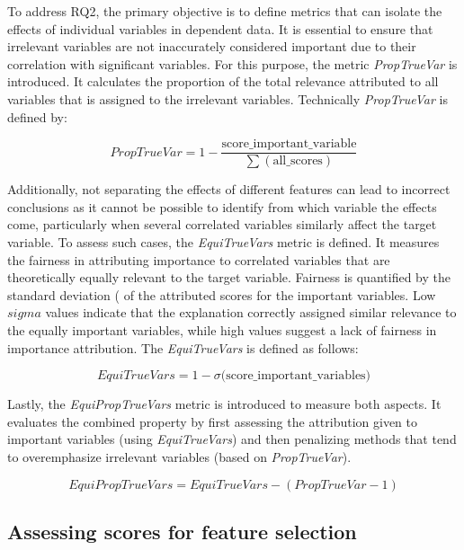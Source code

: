 To address RQ2, the primary objective is to define metrics that can isolate the effects of individual variables in dependent data. It is essential to ensure that irrelevant variables are not inaccurately considered important due to their correlation with significant variables. For this purpose, the metric \textit{PropTrueVar} is introduced. It calculates the proportion of the total relevance attributed to all variables that is assigned to the irrelevant variables. Technically \textit{PropTrueVar} is defined by:


\begin{equation}
\label{eq:lm+inter}
PropTrueVar = 1 - \frac{\text{score\_important\_variable}}{\sum(\text{all\_scores})}
\end{equation}


Additionally, not separating the effects of different features can lead to incorrect conclusions as it cannot be possible to identify from which variable the effects come, particularly when several correlated variables similarly affect the target variable. To assess such cases, the \textit{EquiTrueVars} metric is defined. It measures the fairness in attributing importance to correlated variables that are theoretically equally relevant to the target variable. Fairness is quantified by the standard deviation (\sigma\) of the attributed scores for the important variables. Low \(sigma\) values indicate that the explanation correctly assigned similar relevance to the equally important variables, while high values suggest a lack of fairness in importance attribution. The \textit{EquiTrueVars} is defined as follows:

\begin{equation}
\label{eq:lm+inter}
EquiTrueVars = 1 - \sigma(\text{score\_important\_variables)}
\end{equation}


Lastly, the \textit{EquiPropTrueVars} metric is introduced to measure both aspects. It evaluates the combined property by first assessing the attribution given to important variables (using \textit{EquiTrueVars}) and then penalizing methods that tend to overemphasize irrelevant variables (based on \textit{PropTrueVar}).

\begin{equation}
\label{eq:lm+inter}
EquiPropTrueVars = EquiTrueVars - (PropTrueVar -1)
\end{equation}


\subsection{Assessing scores for feature selection}

